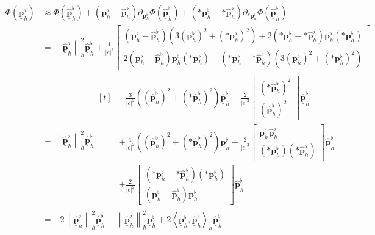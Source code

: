 \documentclass[a4paper,11pt]{scrartcl}
\newcommand{\pflh}{\mathbf{p}^{\flat}_{h}}
\newcommand{\pflhOld}{\widehat{\mathbf{p}}^{\flat}_{h}}
\newcommand{\PDpflh}{\underline{\mathbf{p}}^{\flat}_{h}}
\newcommand{\PDpflhOld}{\underline{\widehat{\mathbf{p}}}^{\flat}_{h}}
\begin{document}
    \begin{align}
      \Phi(\PDpflh) &\approx  \Phi(\PDpflhOld) + \left( \pflh - \pflhOld \right)\partial_{\pflh}\Phi\left( \PDpflhOld \right)
                          + \left( *\pflh - *\pflhOld \right)\partial_{*\pflh}\Phi\left( \PDpflhOld \right) \\
                    &= \left\| \PDpflhOld \right\|_{h}^{2}\PDpflhOld
                    +\frac{1}{\left| e \right|^{2}}
                      \begin{bmatrix}
                        \left( \pflh - \pflhOld \right)\left( 3\left( \pflh \right)^{2} + \left( *\pflh \right)^{2} \right)
                        + 2\left(*\pflh - *\pflhOld\right)\pflh\left( *\pflh \right) \\
                        2\left( \pflh - \pflhOld \right)\pflh\left( *\pflh \right)
                        +\left(*\pflh - *\pflhOld\right)\left( 3\left( \pflh \right)^{2} + \left( *\pflh \right)^{2} \right)
                      \end{bmatrix} \\
       &= \left\| \PDpflhOld \right\|_{h}^{2}\PDpflhOld
          \begin{aligned}[t]
            &-\frac{3}{\left| e \right|^{2}}\left( \left( \pflhOld \right)^{2} + \left( *\pflhOld \right)^{2} \right)\PDpflhOld
            +\frac{2}{\left| e \right|^{2}}
                    \begin{bmatrix}
                      \left( *\pflhOld \right)^{2} \\  \left( \pflhOld \right)^{2}
                    \end{bmatrix}
                    \PDpflhOld \\
            &+\frac{1}{\left| e \right|^{2}}\left( \left( \pflhOld \right)^{2} + \left( *\pflhOld \right)^{2} \right)\PDpflh
            +\frac{2}{\left| e \right|^{2}}
                    \begin{bmatrix}
                      \pflh\pflhOld \\ \left( *\pflh \right)\left( *\pflhOld \right)
                    \end{bmatrix}
                    \PDpflhOld \\
            &+\frac{2}{\left| e \right|^{2}}
                \begin{bmatrix}
                  \left(*\pflh - *\pflhOld\right)\left( *\pflh \right)\\
                  \left( \pflh - \pflhOld \right)\pflh
                \end{bmatrix}
                \PDpflhOld
          \end{aligned}\\
       &= -2\left\| \PDpflhOld \right\|_{h}^{2}\PDpflhOld 
            + \left\| \PDpflhOld \right\|_{h}^{2}\PDpflh
            + 2\left\langle \PDpflh, \PDpflhOld \right\rangle_{h}\PDpflhOld
    \end{align}
\end{document}
